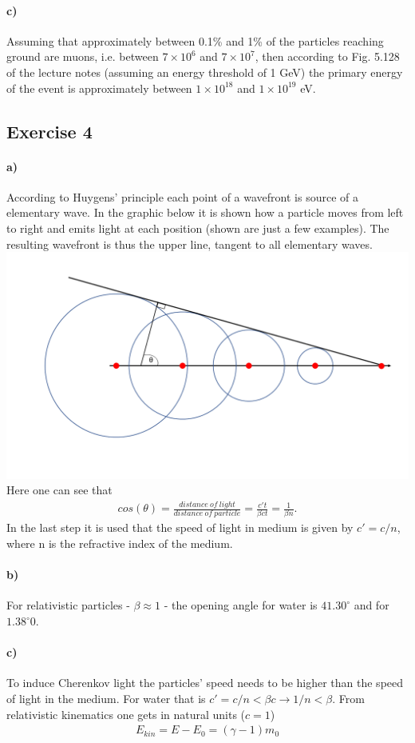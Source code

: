 \documentclass{article}
\begin{document}
\paragraph{c)}
Assuming that approximately between 0.1\% and 1\% of the particles reaching ground are muons, i.e. between $7\times 10^6$ and $7\times 10^7$, then according to Fig. 5.128 of the lecture notes (assuming an energy threshold of 1 GeV) the primary energy of the event is approximately between $1\times 10^{18}$ and $1\times 10^{19}$ eV.

\subsection*{Exercise 4}
\paragraph{a)}
According to Huygens' principle each point of a wavefront is source of a elementary wave. 
In the graphic below it is shown how a particle moves from left to right and emits light at each position (shown are just a few examples). 
The resulting wavefront is thus the upper line, tangent to all elementary waves. \\
\includegraphics[width=\textwidth]{exercise4.png}\\
Here one can see that 
\begin{align*}
cos(\theta) = \frac{distance\ of\ light}{distance\ of\ particle} = \frac{c't}{\beta c t} = \frac{1}{\beta n}.
\end{align*}
In the last step it is used that the speed of light in medium is given by $c' = c / n$, where n is the refractive index of the medium.

\paragraph{b)}
For relativistic particles - $\beta \approx 1$ - the opening angle for water is $41.30^\circ$ and for $1.38^\circ0$.

\paragraph{c)}
To induce Cherenkov light the particles' speed needs to be higher than the speed of light in the medium. For water that is $c' = c/n < \beta c \rightarrow 1/n < \beta$.
From relativistic kinematics one gets in natural units ($c=1$)
\begin{align*}
E_{kin} = E - E_0 = (\gamma - 1) m_0
\end{align*}
\end{document}
